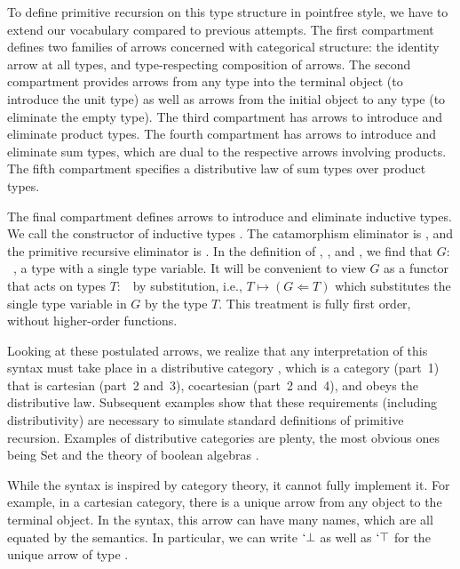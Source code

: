\documentclass[a4paper,USenglish,cleveref, autoref, thm-restate]{lipics-v2021}
\begin{document}
To define primitive recursion on this type structure in pointfree
style, we have to extend our vocabulary compared to previous attempts.
\ccDataPR
The first compartment defines two families of arrows concerned with categorical structure: the identity arrow at all
types, and type-respecting composition of arrows.
The second compartment provides arrows from any type into the
terminal object (to introduce the unit type) as well as arrows from the
initial object to any type (to eliminate the empty type). 
The third compartment has arrows to introduce and eliminate product types.
The fourth compartment has arrows to introduce and eliminate sum types, which are dual to
the respective arrows involving products.
The fifth compartment specifies a distributive law of sum types over product types.

The final compartment
defines arrows to introduce and eliminate inductive types. We call the
constructor of inductive types  {\Acon}.  The catamorphism eliminator
is {\ACt}, and the primitive recursive eliminator is {\AP}.
In the definition of {\Acon}, {\ACt}, and {\AP}, we find that $G :$~, a type with a
single type variable. It will be convenient to view $G$ as a functor
that acts on types $T:$~{\ATY} by substitution, i.e., $T \mapsto (G
\Leftarrow T)$ which substitutes the single type variable in $G$ by
the type $T$.
This treatment is fully first order, without higher-order functions.

Looking at these postulated arrows, we realize that any interpretation
of this syntax must take place in a distributive category
\cite{cockett_1993}, which is a category (part~1) that is cartesian (part~2 and~3), cocartesian
(part~2 and~4), and obeys the distributive law. Subsequent examples show
that these requirements (including distributivity) are
necessary to simulate standard definitions of primitive recursion. 
Examples of distributive categories are plenty, the most obvious ones
being Set and the theory of boolean algebras \cite{cockett_1993}.

While the syntax is inspired by category theory, it cannot fully
implement it. For example, in a cartesian category, there is a unique
arrow from any object to the terminal object. In the syntax, this arrow
can have many names, which are all equated by the semantics. In
particular, we can write $`\bot$ as well as $`\top$ for the unique arrow
of type {\ccZeroOne}.
\end{document}
